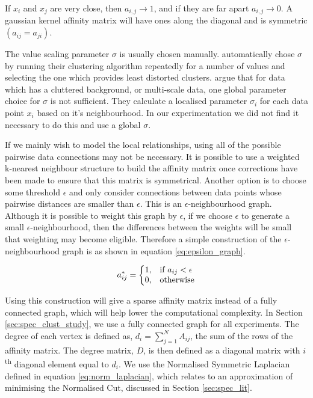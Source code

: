  If $x_i$ and $x_j$ are very close, then $a_{i,j} \rightarrow 1 $, and if they are far apart $a_{i,j} \rightarrow 0$. A gaussian kernel affinity matrix will have ones along the diagonal and is symmetric $(a_{ij} = a_{ji})$.

The value scaling parameter $\sigma$  is usually chosen manually. \cite{Ng2001} automatically chose $\sigma$ by running their clustering algorithm repeatedly for a number of values and selecting the one which provides least distorted clusters. \cite{Zelnik-Manor2004} argue that for data which has a cluttered background, or multi-scale data, one global parameter choice for $\sigma$ is not sufficient. They calculate a localised parameter $\sigma_i$ for each data point $x_i$ based on it's neighbourhood. In our experimentation we did not find it necessary to do this and use a global $\sigma$. 

If we mainly wish to model the local relationships, using all of the possible pairwise data connections may not be necessary. It is possible to use a weighted k-nearest neighbour structure to build the affinity matrix once corrections have been made to ensure that this matrix is symmetrical. Another option is to choose some threshold $\epsilon$ and only consider connections between data points whose pairwise distances are smaller than $\epsilon$. This is an $\epsilon$-neighbourhood graph. Although it is possible to weight this graph by $\epsilon$, if we choose $\epsilon$ to generate a small $\epsilon$-neighbourhood, then the differences between the weights will be small that weighting may become eligible. Therefore a simple construction of the $\epsilon$-neighbourhood graph is as shown in equation \eqref{eq:epsilon_graph}. 

\begin{equation}
\label{eq:epsilon_graph}
  a^*_{ij}=\left\{
  \begin{array}{@{}ll@{}}
    1, & \text{if}\ a_{ij} < \epsilon \\
    0, & \text{otherwise}
  \end{array}\right.
\end{equation} 

Using this construction will give a sparse affinity matrix instead of a fully connected graph, which will help lower the computational complexity. In Section \ref{sec:spec_clust_study}, we use a fully connected graph for all experiments. The degree of each vertex  is defined as, $d_i =\sum_{j = 1}^N A_{ij}$, the sum of the rows of the affinity matrix. The degree matrix, $D$, is then defined as a diagonal matrix with $i$\textsuperscript{th} diagonal element equal to $d_i$. We use the Normalised Symmetric Laplacian \citep{chung1997spectral} defined in equation \eqref{eq:norm_laplacian}, which relates to an approximation of minimising the Normalised Cut, discussed in Section \ref{sec:spec_lit}.  


